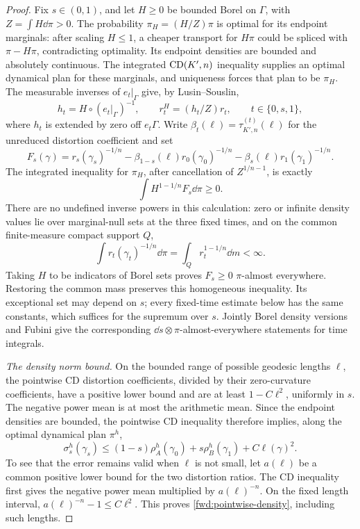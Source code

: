 \begin{proof}
Fix \(s\in(0,1)\), and let \(H\geq0\) be bounded Borel on
\(\Gamma\), with \(Z=\int H\dd\pi>0\). The probability
\(\pi_H=(H/Z)\pi\) is optimal for its endpoint marginals:
after scaling \(H\leq1\), a cheaper transport for \(H\pi\)
could be spliced with \(\pi-H\pi\), contradicting optimality.
Its endpoint densities are bounded and absolutely continuous.
The integrated \(\mathrm{CD}(K',n)\) inequality supplies an optimal
dynamical plan for these marginals, and uniqueness forces that plan
to be \(\pi_H\). The measurable inverses of \(e_t|_\Gamma\)
give, by Lusin--Souslin,
\[
 h_t=H\circ(e_t|_\Gamma)^{-1},\qquad
 r_t^H=(h_t/Z)r_t,\qquad t\in\{0,s,1\},
\]
where \(h_t\) is extended by zero off \(e_t\Gamma\).
Write \(\beta_t(\ell)=\tau_{K',n}^{(t)}(\ell)\) for the
unreduced distortion coefficient and set
\[
 F_s(\gamma)=r_s(\gamma_s)^{-1/n}
 -\beta_{1-s}(\ell)r_0(\gamma_0)^{-1/n}
 -\beta_s(\ell)r_1(\gamma_1)^{-1/n}.
\]
The integrated inequality for \(\pi_H\), after cancellation of
\(Z^{1/n-1}\), is exactly
\[
 \int H^{1-1/n}F_s\dd\pi\geq0.
\]
There are no undefined inverse powers in this calculation: zero or
infinite density values lie over marginal-null sets at the three
fixed times, and on the common finite-measure compact support \(Q\),
\[
 \int r_t(\gamma_t)^{-1/n}\dd\pi
 =\int_Q r_t^{1-1/n}\dd m<\infty.
\]
Taking \(H\) to be indicators of Borel sets proves
\(F_s\geq0\) \(\pi\)-almost everywhere. Restoring the common
mass preserves this homogeneous inequality. Its exceptional set
may depend on \(s\); every fixed-time estimate below has the same
constants, which suffices for the supremum over \(s\).
Jointly Borel density versions and Fubini give the corresponding
\(\dd s\otimes\pi\)-almost-everywhere statements for time integrals.

\emph{The density norm bound.}
On the bounded range of possible geodesic lengths \(\ell\), the
pointwise CD distortion coefficients, divided by their zero-curvature
coefficients, have a positive lower bound and are at least
\(1-C\ell^2\), uniformly in \(s\). The negative power mean is at
most the arithmetic mean. Since the endpoint densities are bounded,
the pointwise CD inequality therefore implies, along the optimal
dynamical plan \(\pi^h\),
\begin{equation}
\label{fwd:pointwise-density}
 \sigma^h_s(\gamma_s)
 \leq (1-s)\rho^h_A(\gamma_0)
       +s\rho^h_B(\gamma_1)+C\ell(\gamma)^2.
\end{equation}
To see that the error remains valid when \(\ell\) is not small,
let \(a(\ell)\) be a common positive lower bound for the two
distortion ratios. The CD inequality first gives the negative power
mean multiplied by \(a(\ell)^{-n}\). On the fixed length interval,
\(a(\ell)^{-n}-1\leq C\ell^2\). This proves
\eqref{fwd:pointwise-density}, including such lengths.


\end{proof}

